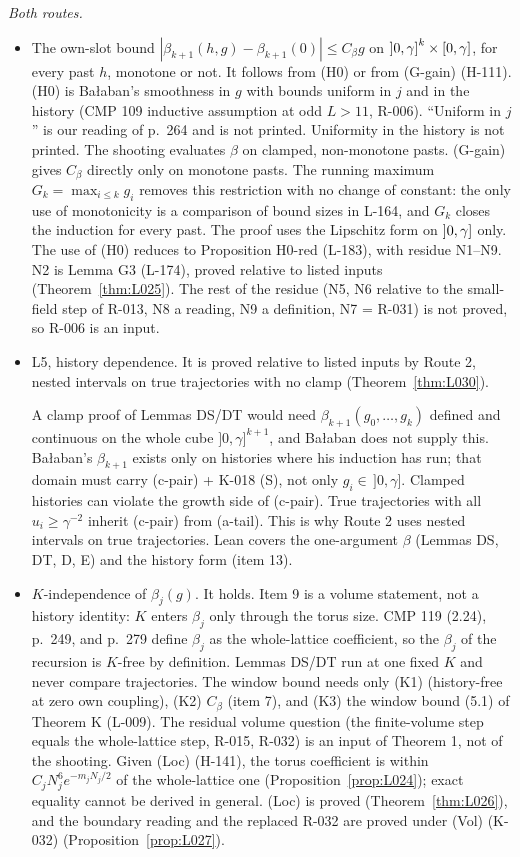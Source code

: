 \emph{Both routes.}
\begin{itemize}
\item[7.] The own-slot bound $|\beta_{k+1}(h,g)-\beta_{k+1}(0)|\le C_\beta g$ on $\mathopen{]}0,\gamma\mathclose{]}^k\times[0,\gamma]$, for every past $h$, monotone or not. It follows from (H0) or from (G-gain) (H-111). (H0) is Ba{\l}aban's smoothness in $g$ with bounds uniform in $j$ and in the history (CMP 109 inductive assumption at odd $L>11$, R-006). ``Uniform in $j$'' is our reading of p.\ 264 and is not printed. Uniformity in the history is not printed. The shooting evaluates $\beta$ on clamped, non-monotone pasts. (G-gain) gives $C_\beta$ directly only on monotone pasts. The running maximum $G_k=\max_{i\le k}g_i$ removes this restriction with no change of constant: the only use of monotonicity is a comparison of bound sizes in L-164, and $G_k$ closes the induction for every past. The proof uses the Lipschitz form on $\mathopen{]}0,\gamma\mathclose{]}$ only. The use of (H0) reduces to Proposition H0-red (L-183), with residue N1--N9. N2 is Lemma G3 (L-174), proved relative to listed inputs (Theorem~\ref{thm:L025}). The rest of the residue (N5, N6 relative to the small-field step of R-013, N8 a reading, N9 a definition, N7 = R-031) is not proved, so R-006 is an input.
\item[8.] L5, history dependence. It is proved relative to listed inputs by Route 2, nested intervals on true trajectories with no clamp (Theorem~\ref{thm:L030}).
\begin{remark}
A clamp proof of Lemmas DS/DT would need $\beta_{k+1}(g_0,\dots,g_k)$ defined and continuous on the whole cube $]0,\gamma]^{k+1}$, and Ba{\l}aban does not supply this. Ba{\l}aban's $\beta_{k+1}$ exists only on histories where his induction has run; that domain must carry (c-pair) + K-018 (S), not only $g_i\in\,]0,\gamma]$. Clamped histories can violate the growth side of (c-pair). True trajectories with all $u_i\ge\gamma^{-2}$ inherit (c-pair) from (a-tail). This is why Route 2 uses nested intervals on true trajectories. Lean covers the one-argument $\beta$ (Lemmas DS, DT, D, E) and the history form (item 13).
\end{remark}
\item[9.] $K$-independence of $\beta_j(g)$. It holds. Item 9 is a volume statement, not a history identity: $K$ enters $\beta_j$ only through the torus size. CMP 119 (2.24), p.\ 249, and p.\ 279 define $\beta_j$ as the whole-lattice coefficient, so the $\beta_j$ of the recursion is $K$-free by definition. Lemmas DS/DT run at one fixed $K$ and never compare trajectories. The window bound needs only (K1) (history-free at zero own coupling), (K2) $C_\beta$ (item 7), and (K3) the window bound (5.1) of Theorem K (L-009). The residual volume question (the finite-volume step equals the whole-lattice step, R-015, R-032) is an input of Theorem 1, not of the shooting. Given (Loc) (H-141), the torus coefficient is within $C_jN_j^6e^{-m_jN_j/2}$ of the whole-lattice one (Proposition~\ref{prop:L024}); exact equality cannot be derived in general. (Loc) is proved (Theorem~\ref{thm:L026}), and the boundary reading and the replaced R-032 are proved under (Vol) (K-032) (Proposition~\ref{prop:L027}).

\end{itemize}
